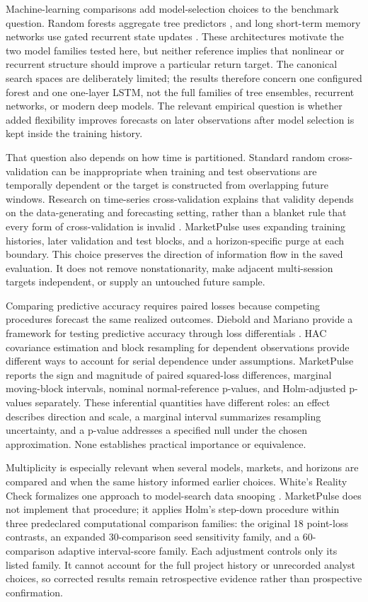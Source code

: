 \documentclass[11pt]{article}
\begin{document}
Machine-learning comparisons add model-selection choices to the benchmark question. Random forests aggregate tree predictors \citep{breiman2001}, and long short-term memory networks use gated recurrent state updates \citep{hochreiter1997}. These architectures motivate the two model families tested here, but neither reference implies that nonlinear or recurrent structure should improve a particular return target. The canonical search spaces are deliberately limited; the results therefore concern one configured forest and one one-layer LSTM, not the full families of tree ensembles, recurrent networks, or modern deep models. The relevant empirical question is whether added flexibility improves forecasts on later observations after model selection is kept inside the training history.

That question also depends on how time is partitioned. Standard random cross-validation can be inappropriate when training and test observations are temporally dependent or the target is constructed from overlapping future windows. Research on time-series cross-validation explains that validity depends on the data-generating and forecasting setting, rather than a blanket rule that every form of cross-validation is invalid \citep{bergmeir2018}. MarketPulse uses expanding training histories, later validation and test blocks, and a horizon-specific purge at each boundary. This choice preserves the direction of information flow in the saved evaluation. It does not remove nonstationarity, make adjacent multi-session targets independent, or supply an untouched future sample.

Comparing predictive accuracy requires paired losses because competing procedures forecast the same realized outcomes. Diebold and Mariano provide a framework for testing predictive accuracy through loss differentials \citep{diebold1995}. HAC covariance estimation \citep{newey1986} and block resampling for dependent observations \citep{kunsch1989} provide different ways to account for serial dependence under assumptions. MarketPulse reports the sign and magnitude of paired squared-loss differences, marginal moving-block intervals, nominal normal-reference p-values, and Holm-adjusted p-values separately. These inferential quantities have different roles: an effect describes direction and scale, a marginal interval summarizes resampling uncertainty, and a p-value addresses a specified null under the chosen approximation. None establishes practical importance or equivalence.

Multiplicity is especially relevant when several models, markets, and horizons are compared and when the same history informed earlier choices. White's Reality Check formalizes one approach to model-search data snooping \citep{white2000}. MarketPulse does not implement that procedure; it applies Holm's step-down procedure \citep{holm1979} within three predeclared computational comparison families: the original 18 point-loss contrasts, an expanded 30-comparison seed sensitivity family, and a 60-comparison adaptive interval-score family. Each adjustment controls only its listed family. It cannot account for the full project history or unrecorded analyst choices, so corrected results remain retrospective evidence rather than prospective confirmation.
\end{document}
